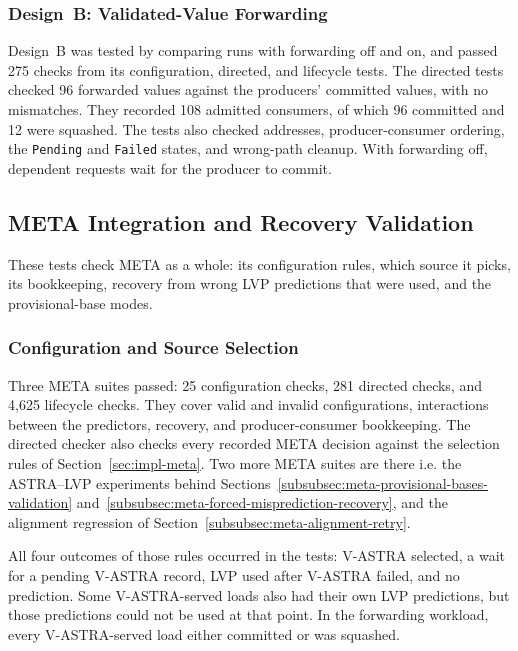 \subsubsection{Design~B: Validated-Value Forwarding}
\label{subsubsec:validated-value-forwarding-validation}

Design~B was tested by comparing runs with forwarding off and on, and
passed 275 checks from its configuration, directed, and lifecycle
tests. The directed tests checked 96 forwarded values against the
producers' committed values, with no mismatches. They recorded 108
admitted consumers, of which 96 committed and 12 were squashed. The
tests also checked addresses, producer-consumer ordering, the
\texttt{Pending} and \texttt{Failed} states, and wrong-path cleanup.
With forwarding off, dependent requests wait for the producer to
commit.

\subsection{META Integration and Recovery Validation}
\label{subsec:meta-integration-recovery-validation}

These tests check META as a whole: its configuration rules, which
source it picks, its bookkeeping, recovery from wrong LVP predictions
that were used, and the provisional-base modes.

\subsubsection{Configuration and Source Selection}
\label{subsubsec:meta-configuration-directed-tests}
\label{subsubsec:meta-lifecycle-source-selection}

Three META suites passed: 25 configuration checks, 281 directed
checks, and 4,625 lifecycle checks. They cover valid and invalid
configurations, interactions between the predictors, recovery, and
producer-consumer bookkeeping. The directed checker also checks every
recorded META decision against the selection rules of
Section~\ref{sec:impl-meta}. Two more META suites are there i.e. the ASTRA--LVP experiments behind Sections~\ref{subsubsec:meta-provisional-bases-validation}
and~\ref{subsubsec:meta-forced-misprediction-recovery}, and the
alignment regression of Section~\ref{subsubsec:meta-alignment-retry}.

All four outcomes of those rules occurred in the tests: V-ASTRA
selected, a wait for a pending V-ASTRA record, LVP used after
V-ASTRA failed, and no prediction. Some V-ASTRA-served loads also had their own LVP predictions, but
those predictions could not be used at that point. In the forwarding
workload, every V-ASTRA-served load either committed or was squashed.

